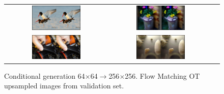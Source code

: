 \documentclass{article}
\begin{document}
\begin{figure}
\begin{tabular}{@{}ccc@{}}
     \includegraphics[width=0.5\textwidth]{figures/upsampled/upsample_40.png} & \includegraphics[width=0.5\textwidth]{figures/upsampled/upsample_102.png} \\ \includegraphics[width=0.5\textwidth]{figures/upsampled/upsample_106.png} & \includegraphics[width=0.5\textwidth]{figures/upsampled/upsample_107.png} \\
\end{tabular}
    \caption{Conditional generation 64$\times$64$\rightarrow$256$\times$256. Flow Matching OT upsampled images from validation set.}
    \label{fig:upsampled_1}
\end{figure}
\end{document}

